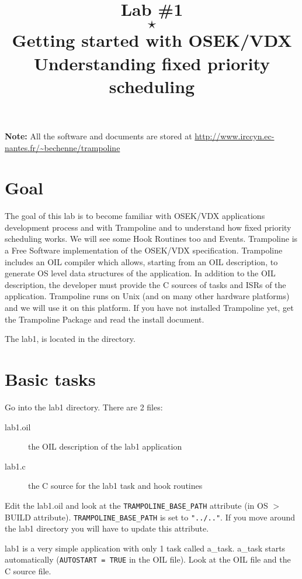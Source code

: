 \documentclass[11pt]{article}
\title{Lab \#1\\$\star$\\Getting started with OSEK/VDX\\\large{
Understanding fixed priority scheduling}}
\author{}
\newcommand{\unixcl}[1]{\texttt{\fcolorbox{black}{gray!20}{#1}}}
\begin{document}
\maketitle

{\bf Note:} All the software and documents are stored at \url{http://www.irccyn.ec-nantes.fr/~bechenne/trampoline}

\section{Goal}

The goal of this lab is to become familiar with OSEK/VDX applications development process and with Trampoline and to understand how fixed priority scheduling works. We will see some Hook Routines too and Events. Trampoline is a Free Software implementation of the OSEK/VDX specification. Trampoline includes an OIL compiler which allows, starting from an OIL description, to generate OS level data structures of the application. In addition to the OIL description, the developer must provide the C sources of tasks and ISRs of the application. Trampoline runs on Unix (and on many other hardware platforms) and we will use it on this platform. If you have not installed Trampoline yet, get the Trampoline Package and read the install document.

The lab1, is located in the \unixcl{trampoline/labs/lab1} directory.

\section{Basic tasks}

Go into the lab1 directory. There are 2 files:

\begin{description}
\item[lab1.oil] the OIL description of the lab1 application
\item[lab1.c] the C source for the lab1 task and hook routines
\end{description}

Edit the lab1.oil and look at the \texttt{TRAMPOLINE_BASE_PATH} attribute (in OS $>$ BUILD attribute).  \texttt{TRAMPOLINE_BASE_PATH} is set to \texttt{"../.."}. If you move around the lab1 directory you will have to update this attribute.


lab1 is a very simple application with only 1 task called a_task. a_task starts automatically (\texttt{AUTOSTART = TRUE} in the OIL file). Look at the OIL file and the C source file.
\end{document}

